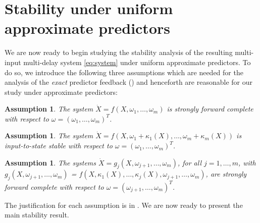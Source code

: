 \documentclass[letterpaper, 10 pt, conference]{ieeeconf}  %
\newtheorem{assumption}[theorem]{Assumption}
\begin{document}
\section{Stability under uniform approximate predictors} \label{sec:stability}
We are now ready to begin studying the stability analysis of the resulting multi-input multi-delay system \eqref{eq:system} under uniform approximate predictors. To do so, we introduce the following three assumptions which are needed for the analysis of the \emph{exact} predictor feedback (\cite{Krstic:2010, Nonlinear_Control_Under_Nonconstant_Delay, Bekiaris-Liberis_Krstic:2016}) and henceforth are reasonable for our study under approximate predictors:
\begin{assumption}\label{assumption:strongly-forward-complete}
\sloppy The system $\dot{X} = f(X, \omega_1, \ldots, \omega_m)$ is strongly forward complete with respect to $\omega = (\omega_1, \ldots, \omega_m)^T$.
\end{assumption}
\begin{assumption}\label{assumption:iss}
\sloppy The system $\dot{X} = f(X, \omega_1 + \kappa_1(X), \ldots, \omega_m + \kappa_m(X))$ is input-to-state stable with respect to $\omega = (\omega_1, \ldots, \omega_m)^T$.
\end{assumption}
\begin{assumption}\label{assumption:strongly-forward-complete-2}
\sloppy The systems $\dot{X} = g_j(X, \omega_{j+1}, \ldots, \omega_m)$, for all $j=1,\dots,m$, with $g_j(X, \omega_{j+1}, \ldots, \omega_m)$ = $f(X, \kappa_1(X), \ldots, \kappa_j(X), \omega_{j+1}, \ldots, \omega_m)$, are strongly forward complete with respect to $\omega = (\omega_{j+1}, \ldots, \omega_m)^T$.
\end{assumption}

The justification for each assumption is in \cite{Bekiaris-Liberis_Krstic:2016}. We are now ready to present the main stability result. 
\end{document}
